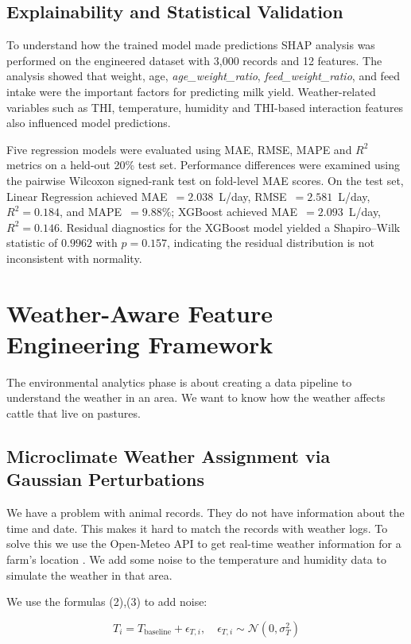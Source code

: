 \documentclass[conference]{IEEEtran}
\begin{document}
	\subsection{Explainability and Statistical Validation}
	To understand how the trained model made predictions SHAP analysis was performed on the engineered dataset with 3,000 records and 12 features. The analysis showed that weight, age, \textit{age\_weight\_ratio}, \textit{feed\_weight\_ratio}, and feed intake were the important factors for predicting milk yield. Weather-related variables such as THI, temperature, humidity and THI-based interaction features also influenced model predictions.
	
	Five regression models were evaluated using MAE, RMSE, MAPE and $R^2$ metrics on a held-out 20\% test set. Performance differences were examined using the pairwise Wilcoxon signed-rank test on fold-level MAE scores. On the test set, Linear Regression achieved MAE~$= 2.038$~L/day, RMSE~$= 2.581$~L/day, $R^2 = 0.184$, and MAPE~$= 9.88\%$; XGBoost achieved MAE~$= 2.093$~L/day, $R^2 = 0.146$. Residual diagnostics for the XGBoost model yielded a Shapiro--Wilk statistic of $0.9962$ with $p = 0.157$, indicating the residual distribution is not inconsistent with normality.
	
	\section{Weather-Aware Feature Engineering Framework}
	The environmental analytics phase is about creating a data pipeline to understand the weather in an area. We want to know how the weather affects cattle that live on pastures.
	
	\subsection{Microclimate Weather Assignment via Gaussian Perturbations}
	We have a problem with animal records. They do not have information about the time and date. This makes it hard to match the records with weather logs. To solve this we use the Open-Meteo API to get real-time weather information for a farm's location \cite{ref1}. We add some noise to the temperature and humidity data to simulate the weather in that area.
	
	We use the formulas (2),(3) to add noise:
	
\begin{equation}
	T_i = T_{\text{baseline}} + \epsilon_{T,i}, \quad
	\epsilon_{T,i} \sim \mathcal{N}(0,\sigma_T^2)
	\tag{2}
\end{equation}
\end{document}
